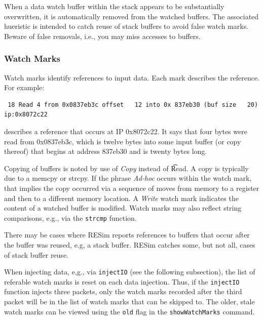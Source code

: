 \documentclass[titlepage]{article}
\begin{document}
When a data watch buffer within the stack appears to be substantially overwritten, it is automatically removed from the watched buffers.
The associated hueristic is intended to catch reuse of stack buffers to avoid false watch marks.  Beware of false removals, i.e., you
may miss accesses to buffers.

\subsubsection{Watch Marks}
Watch marks identify references to input data.  Each mark describes the reference.  For example:

\begin{verbatim}
 18 Read 4 from 0x0837eb3c offset   12 into 0x 837eb30 (buf size   20)   ip:0x8072c22
\end{verbatim}
\noindent describes a reference that occurs at IP 0x8072c22.  It says that four bytes were read from 0x0837eb3c, which is twelve bytes into some input buffer
(or copy thereof) that begins at address 837eb30 and is twenty bytes long.

Copying of buffers is noted by use of \textit{Copy} instead of \t{Read}.  A copy is typically due to a memcpy or strcpy.  If the phrase \textit{Ad-hoc} occurs
within the watch mark, that implies the copy occurred via a sequence of moves from memory to a register and then to a different memory location.
A \textit{Write} watch mark indicates the content of a watched buffer is modified.  Watch marks may also reflect string comparisons, e.g., via the {\tt strcmp}
function.

There may be cases where RESim reports references to buffers that occur after the buffer was reused, e.g, a stack buffer.  RESim catches some, but not all,
cases of stack buffer reuse.

When injecting data, e,g., via {\tt injectIO} (see the following subsection), the list of referable watch marks is reset on each data injection.  Thus, if the {\tt injectIO} function injects
three packets, only the watch marks recorded after the third packet will be in the list of watch marks that can be skipped to.  The older, stale watch marks can
be viewed using the {\tt old} flag in the {\tt showWatchMarks} command.
\end{document}
